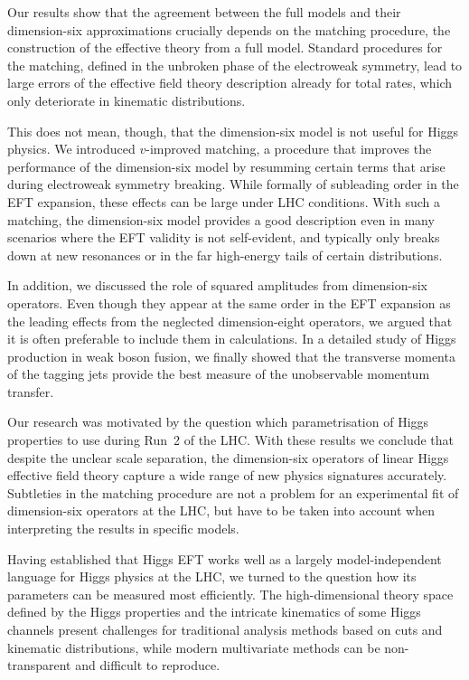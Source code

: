 Our results show that the agreement between the full models and their
dimension-six approximations crucially depends on the matching
procedure, \ie the construction of the effective theory from a full
model. Standard procedures for the matching, defined in the unbroken
phase of the electroweak symmetry, lead to large errors of the
effective field theory description already for total rates, which only
deteriorate in kinematic distributions.

This does not mean, though, that the dimension-six model is not useful
for Higgs physics. We introduced $v$-improved matching, a procedure
that improves the performance of the dimension-six model by resumming
certain terms that arise during electroweak symmetry breaking. While
formally of subleading order in the EFT expansion, these effects can
be large under LHC conditions. With such a matching, the dimension-six
model provides a good description even in many scenarios where the EFT
validity is not self-evident, and typically only breaks down at new
resonances or in the far high-energy tails of certain distributions.

In addition, we discussed the role of squared amplitudes from
dimension-six operators. Even though they appear at the same order in
the EFT expansion as the leading effects from the neglected
dimension-eight operators, we argued that it is often preferable to
include them in calculations. In a detailed study of Higgs production
in weak boson fusion, we finally showed that the transverse momenta of
the tagging jets provide the best measure of the unobservable momentum
transfer.

Our research was motivated by the question which parametrisation of
Higgs properties to use during Run~2 of the LHC. With these results we
conclude that despite the unclear scale separation, the dimension-six
operators of linear Higgs effective field theory capture a wide range
of new physics signatures accurately. Subtleties in the matching
procedure are not a problem for an experimental fit of dimension-six
operators at the LHC, but have to be taken into account when
interpreting the results in specific models.

\newparagraph
%
Having established that Higgs EFT works well as a largely
model-independent language for Higgs physics at the LHC, we turned to
the question how its parameters can be measured most efficiently. The
high-dimensional theory space defined by the Higgs properties and the
intricate kinematics of some Higgs channels present challenges for
traditional analysis methods based on cuts and kinematic
distributions, while modern multivariate methods can be
non-transparent and difficult to reproduce.

